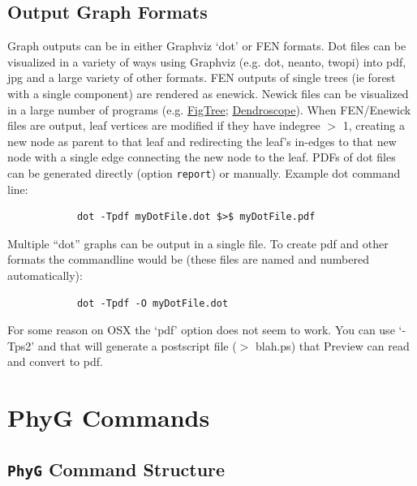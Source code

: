 \documentclass[11pt]{book}
\newcommand{\phyg}{\texttt{PhyG} }
\begin{document}
{{	\section{Output Graph Formats}
	Graph outputs can be in either Graphviz `dot' or FEN formats. Dot files can be visualized in a variety of ways 
	using Graphviz (e.g. dot, neanto, twopi) into pdf, jpg and a large variety of other formats. FEN outputs of 
	single trees (ie forest with a single component) are rendered as enewick. Newick files can be visualized in a 
	large number of programs (e.g. \href{http://tree.bio.ed.ac.uk/software/figtree/}{FigTree}; 
	\href{http:/https://uni-tuebingen.de/fakultaeten/mathematisch-naturwissenschaftliche-fakultaet/fachbereiche/informatik/lehrstuehle/algorithms-in-bioinformatics/software/}
	{Dendroscope}). 	
	When FEN/Enewick files are output, leaf vertices are modified if they have indegree $>$ 1, creating a new node as parent to that leaf
	and redirecting the leaf's in-edges to that new node with a single edge connecting the new node to the leaf. PDFs of dot files can be generated directly (option \texttt{report}) or manually.  Example dot command line: 
	
		\begin{verbatim}
			dot -Tpdf myDotFile.dot $>$ myDotFile.pdf
		\end{verbatim}
		
	Multiple ``dot'' graphs can be output in a single file. To create pdf and other formats the
	commandline would be (these files are named and numbered automatically):
	
		\begin{verbatim}
			dot -Tpdf -O myDotFile.dot
		\end{verbatim}
		
	For some reason on OSX the `pdf' option does not seem to work. You can use `-Tps2' and that will generate 
	a postscript file ($>$ blah.ps) that Preview can read and convert to pdf.

	

	
\chapter{PhyG Commands}

\section{\phyg Command Structure}
		
}}
\end{document}
